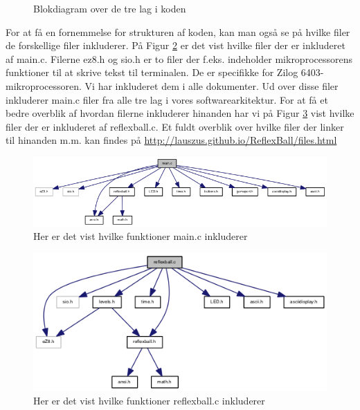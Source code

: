 \begin{center}
\begin{figure}
\caption{Blokdiagram over de tre lag i koden}
\label{fig:blockdiagram}
\end{figure}

\end{center}

For at få en fornemmelse for strukturen af koden, kan man også se på hvilke filer de forskellige filer inkluderer. På Figur \ref{fig:main_incl} er det vist hvilke filer der er inkluderet af main.c. Filerne ez8.h og sio.h er to filer der f.eks. indeholder mikroprocessorens funktioner til at skrive tekst til terminalen. De er specifikke for Zilog 6403-mikroprocessoren. Vi har inkluderet dem i alle dokumenter. Ud over disse filer inkluderer main.c filer fra alle tre lag i vores softwarearkitektur. For at få et bedre overblik af hvordan filerne inkluderer hinanden har vi på Figur \ref{fig:reflexball_incl} vist hvilke filer der er inkluderet af reflexball.c. Et fuldt overblik over hvilke filer der linker til hinanden m.m. kan findes på \url{http://lauszus.github.io/ReflexBall/files.html} \\

\begin{figure}[h!]
\centering
\includegraphics[scale=0.6]{figs/main_incl.png}
\caption{Her er det vist hvilke funktioner main.c inkluderer}
\label{fig:main_incl}
\end{figure}

\begin{figure}[h!]
\centering
\includegraphics[scale=0.8]{figs/reflexball_incl.png}
\caption{Her er det vist hvilke funktioner reflexball.c inkluderer}
\label{fig:reflexball_incl}
\end{figure}